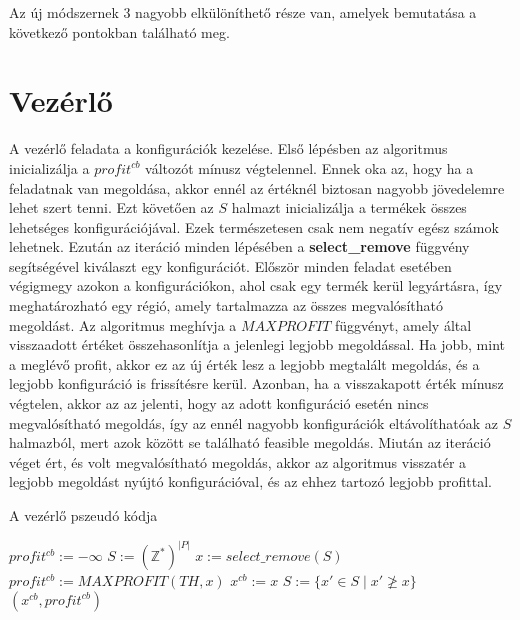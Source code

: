 Az új módszernek 3 nagyobb elkülöníthető része van, amelyek bemutatása a következő pontokban található meg.

\section{Vezérlő}
A vezérlő feladata a konfigurációk kezelése.
Első lépésben az algoritmus inicializálja a $profit^{cb}$ változót mínusz végtelennel.
Ennek oka az, hogy ha a feladatnak van megoldása, akkor ennél az értéknél biztosan nagyobb jövedelemre lehet szert tenni.
Ezt követően az $S$ halmazt inicializálja a termékek összes lehetséges konfigurációjával.
Ezek természetesen csak nem negatív egész számok lehetnek.
Ezután az iteráció minden lépésében a \textbf{select\_remove} függvény segítségével kiválaszt egy konfigurációt.
Először minden feladat esetében végigmegy azokon a konfigurációkon, ahol csak egy termék kerül legyártásra, így meghatározható egy régió, amely tartalmazza az összes megvalósítható megoldást.
Az algoritmus meghívja a $MAXPROFIT$ függvényt, amely által visszaadott értéket összehasonlítja a jelenlegi legjobb megoldással.
Ha jobb, mint a meglévő profit, akkor ez az új érték lesz a legjobb megtalált megoldás, és a legjobb konfiguráció is frissítésre kerül.
Azonban, ha a visszakapott érték mínusz végtelen, akkor az az jelenti, hogy az adott konfiguráció esetén nincs megvalósítható megoldás, így az ennél nagyobb konfigurációk eltávolíthatóak az $S$ halmazból, mert azok között se található feasible megoldás.
Miután az iteráció véget ért, és volt megvalósítható megoldás, akkor az algoritmus visszatér a legjobb megoldást nyújtó konfigurációval, és az ehhez tartozó legjobb profittal.

\begin{algorithm}[H]
\caption{A vezérlő pszeudó kódja}
\label{vezerlo}
\begin{algorithmic}[1]
	\State $profit^{cb}:= -\infty$
	\State $S:= (\mathbb{Z}^*)^{|P|}$
    	\State $x:= select\_remove(S)$
    		\State $profit^{cb}:=MAXPROFIT(TH,x)$
    		\State $x^{cb}:=x$    		
    		\State $S:=\{x'\in{S} \mid  x' \not\ge x\}$
    	\EndIf
    \EndWhile
    	\State \Return $(x^{cb},profit^{cb})$
    \EndIf
\EndProcedure
\end{algorithmic}
\end{algorithm}

